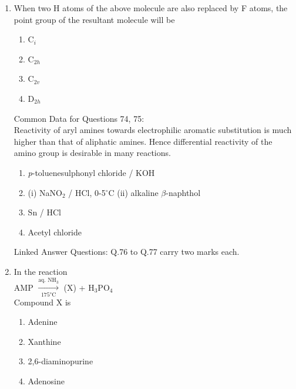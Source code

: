 \documentclass[journal,12pt,onecolumn]{IEEEtran}
\theoremstyle{remark}
\begin{document}
\begin{enumerate}
\item  When two H atoms of the above molecule are also replaced by F atoms, the point group of the resultant molecule will be \hfill{}

\begin{multicols}{2}
\begin{enumerate}
\item C$_i$
\item C$_{2h}$
\item C$_{2v}$
\item D$_{2h}$
\end{enumerate}
\end{multicols}
 

{Common Data for Questions 74, 75:} \\
Reactivity of aryl amines towards electrophilic aromatic substitution is much higher than that of aliphatic amines. Hence differential reactivity of the amino group is desirable in many reactions.
 



\begin{multicols}{2}
\begin{enumerate}
\item \textit{p}-toluenesulphonyl chloride / KOH
\item (i) NaNO$_2$ / HCl, 0-5$^\circ$C \quad (ii) alkaline $\beta$-naphthol
\item Sn / HCl
\item Acetyl chloride
\end{enumerate}
\end{multicols}

{Linked Answer Questions: Q.76 to Q.77 carry two marks each.}
 
   

 \item  In the reaction\\
\hspace*{1cm} AMP \hspace{0.5cm} $\xrightarrow[\text{175°C}]{\text{aq. NH}_3}$ \hspace{0.5cm} (X) + H$_3$PO$_4$\\
Compound X is \hfill{}
\begin{multicols}{2}
\begin{enumerate}
    \item Adenine
    \item Xanthine
    \item 2,6-diaminopurine
    \item Adenosine
\end{enumerate}
\end{multicols}
 

\end{enumerate}
\end{document}

